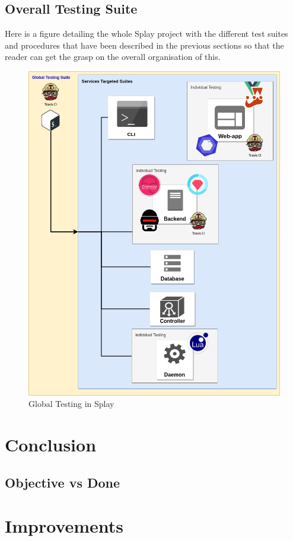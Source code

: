 \documentclass{eplmastersthesis}
\begin{document}
    \section{Overall Testing Suite}

      Here is a figure detailing the whole Splay project with the different
      test suites and procedures that have been described in the previous
      sections so that the reader can get the grasp on the overall
      organisation of this.

      \begin{figure}[H]
        \centering
        \includegraphics[scale=0.6]{figures/global_testing.png}
        \caption{\label{prev_arch} Global Testing in Splay}
      \end{figure}

  \chapter{Conclusion}

    \section{Objective vs Done}

    \section{}

  \chapter{Improvements}


  \nocite{*}
  
  




  \backcoverpage
\end{document}

